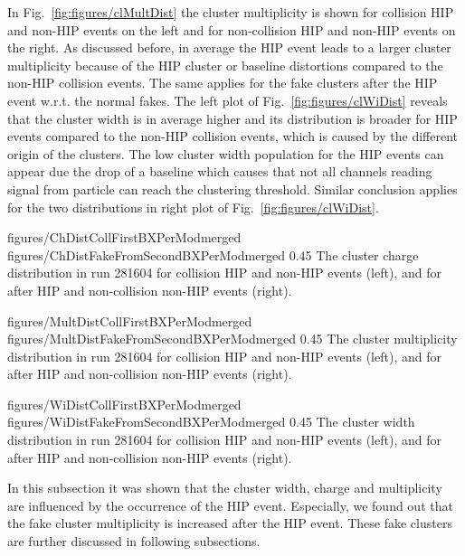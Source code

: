 In Fig.~\ref{fig:figures/clMultDist} the cluster multiplicity is shown for collision HIP and non-HIP events on the left and for  non-collision HIP and non-HIP events on the right. As discussed before, in average the HIP event leads to a larger cluster multiplicity because of the HIP cluster or baseline distortions compared to the non-HIP collision events. The same applies for the fake clusters after the HIP event w.r.t. the normal fakes. The left plot of Fig.~\ref{fig:figures/clWiDist} reveals that the cluster width is in average higher and its distribution is broader for HIP events compared to the non-HIP collision events, which is caused by the different origin of the clusters. The low cluster width population for the HIP events can appear due the drop of a baseline which causes that not all channels reading signal from particle can reach the clustering threshold. Similar conclusion applies for the two distributions in right plot of Fig.~\ref{fig:figures/clWiDist}.  

                 {figures/ChDistCollFirstBXPerModmerged} %
                 {figures/ChDistFakeFromSecondBXPerModmerged} %
                 {0.45}       %
                 { The cluster charge distribution in run 281604 for collision HIP and non-HIP events (left), and for after HIP and non-collision non-HIP events (right).   } %

                 {figures/MultDistCollFirstBXPerModmerged} %
                 {figures/MultDistFakeFromSecondBXPerModmerged} %
                 {0.45}       %
                 { The cluster multiplicity distribution in run 281604 for collision HIP and non-HIP events (left), and for after HIP and non-collision non-HIP events (right). } %

                 {figures/WiDistCollFirstBXPerModmerged} %
                 {figures/WiDistFakeFromSecondBXPerModmerged} %
                 {0.45}       %
                 {  The cluster width distribution in run 281604 for collision HIP and non-HIP events (left), and for after HIP and non-collision non-HIP events (right).} %


In this subsection it was shown that the cluster width, charge and multiplicity are influenced by the occurrence of the HIP event. Especially, we found out that the fake cluster multiplicity is increased after the HIP event. These fake clusters are further discussed in following subsections.

